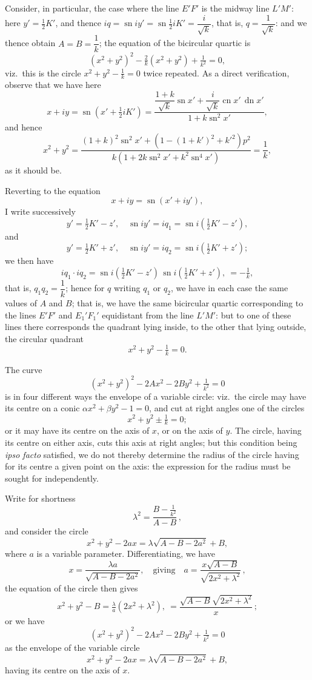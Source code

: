 \documentclass[11pt,a4paper]{article}
\DeclareMathOperator{\sn}{sn}
\DeclareMathOperator{\cn}{cn}
\DeclareMathOperator{\dn}{dn}
\begin{document}
Consider, in particular, the case where the line $E'F'$ is the midway line $L'M'$: here $y' = \tfrac{1}{2}K'$, and thence $iq = \sn iy' = \sn \tfrac{1}{2}iK' = \dfrac{i}{\sqrt{k}}$, that is, $q = \dfrac{1}{\sqrt{k}}$: and we thence obtain $A = B = \dfrac{1}{k}$; the equation of the bicircular quartic is
\[
(x^2 + y^2)^2 - \tfrac{2}{k}(x^2 + y^2) + \tfrac{1}{k^2} = 0,
\]
viz.\ this is the circle $x^2 + y^2 - \tfrac{1}{k} = 0$ twice repeated. As a direct verification, observe that we have here
\[
x + iy = \sn\left(x' + \tfrac{1}{2}iK'\right) = \frac{\dfrac{1+k}{\sqrt{k}}\sn x' + \dfrac{i}{\sqrt{k}}\cn x'\,\dn x'}{1 + k\sn^2 x'},
\]
and hence
\[
x^2 + y^2 = \frac{(1+k)^2\sn^2 x' + (1 - (1 + k')^2 + k'^2)p^2}{k(1 + 2k\sn^2 x' + k^2\sn^4 x')} = \frac{1}{k},
\]
as it should be.

Reverting to the equation
\[
x + iy = \sn(x' + iy'),
\]
I write successively
\[
y' = \tfrac{1}{2}K' - z',\quad \sn iy' = iq_1 = \sn i(\tfrac{1}{2}K' - z'),
\]
and
\[
y' = \tfrac{1}{2}K' + z',\quad \sn iy' = iq_2 = \sn i(\tfrac{1}{2}K' + z');
\]
we then have
\[
iq_1\cdot iq_2 = \sn i(\tfrac{1}{2}K' - z')\,\sn i(\tfrac{1}{2}K' + z'),\ = -\tfrac{1}{k},
\]
that is, $q_1 q_2 = \dfrac{1}{k}$; hence for $q$ writing $q_1$ or $q_2$, we have in each case the same values of $A$ and $B$; that is, we have the same bicircular quartic corresponding to the lines $E'F'$ and $E_1'F_1'$ equidistant from the line $L'M'$: but to one of these lines there corresponds the quadrant lying inside, to the other that lying outside, the circular quadrant
\[
x^2 + y^2 - \tfrac{1}{k} = 0.
\]

The curve
\[
(x^2 + y^2)^2 - 2Ax^2 - 2By^2 + \tfrac{1}{k^2} = 0
\]
is in four different ways the envelope of a variable circle: viz.\ the circle may have its centre on a conic $\alpha x^2 + \beta y^2 - 1 = 0$, and cut at right angles one of the circles
\[
x^2 + y^2 \pm \tfrac{1}{k} = 0;
\]
or it may have its centre on the axis of $x$, or on the axis of $y$. The circle, having its centre on either axis, cuts this axis at right angles; but this condition being \emph{ipso facto} satisfied, we do not thereby determine the radius of the circle having for its centre a given point on the axis: the expression for the radius must be sought for independently.

Write for shortness
\[
\lambda^2 = \frac{B - \tfrac{1}{k^2}}{A - B}\,,
\]
and consider the circle
\[
x^2 + y^2 - 2ax = \lambda\sqrt{A - B - 2a^2} + B,
\]
where $a$ is a variable parameter. Differentiating, we have
\[
x = \frac{\lambda a}{\sqrt{A - B - 2a^2}},\quad\text{giving}\quad a = \frac{x\sqrt{A - B}}{\sqrt{2x^2 + \lambda^2}}\,,
\]
the equation of the circle then gives
\[
x^2 + y^2 - B = \tfrac{\lambda}{a}(2x^2 + \lambda^2),\ = \frac{\sqrt{A - B}\sqrt{2x^2 + \lambda^2}}{x}\,;
\]
or we have
\[
(x^2 + y^2)^2 - 2Ax^2 - 2By^2 + \tfrac{1}{k^2} = 0
\]
as the envelope of the variable circle
\[
x^2 + y^2 - 2ax = \lambda\sqrt{A - B - 2a^2} + B,
\]
having its centre on the axis of $x$.
\end{document}

